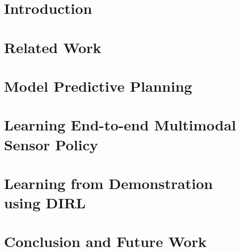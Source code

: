 \documentclass[hidelinks, 12pt]{cmuthesis}
\begin{document}
\chapter{Introduction}


\chapter{Related Work} \label{chap:related_work}


\chapter{Model Predictive Planning} \label{chap:rrtplanner}


\chapter{Learning End-to-end Multimodal Sensor Policy} \label{chap:multimodalDRL}


\chapter{Learning from Demonstration using DIRL} \label{chap:dirl}


\chapter{Conclusion and Future Work} \label{chap:conclusion}


%

\backmatter


\renewcommand{\bibsection}{\chapter{\bibname}}
% 

\nocite{*}
\end{document}
